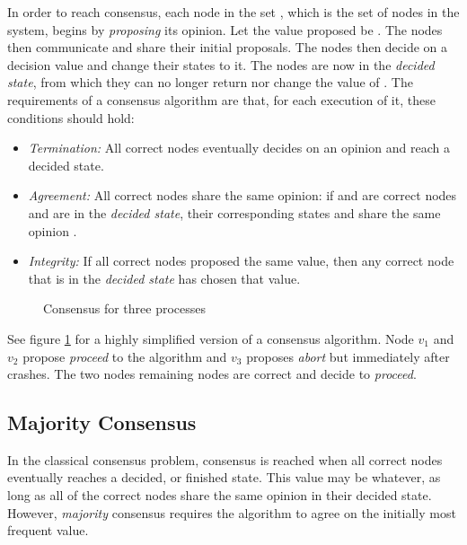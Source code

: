 In order to reach consensus, each node in the set , which is the set of nodes in the system, begins by \emph{proposing} its opinion. Let the value proposed be . The nodes then communicate and share their initial proposals. The nodes then decide on a decision value  and change their states to it. The nodes are now in the \emph{decided state}, from which they can no longer return nor change the value of . The requirements of a consensus algorithm are that, for each execution of it, these conditions should hold:

\begin{itemize}[label={}]
  \item \emph{Termination:} All correct nodes eventually decides on an opinion and reach a decided state.
  \item \emph{Agreement:} All correct nodes share the same opinion: if  and  are correct nodes and are in the \emph{decided state}, their corresponding states  and  share the same opinion .
  \item \emph{Integrity:} If all correct nodes proposed the same value, then any correct node that is in the \emph{decided state} has chosen that value.
\end{itemize}


\begin{figure}[H]
    \centering
    
    \caption{Consensus for three processes}
    \label{fig:ConsensusProblem}
\end{figure}


See figure \ref{fig:ConsensusProblem} for a highly simplified version of a consensus algorithm. Node $v_1$ and $v_2$ propose \emph{proceed} to the algorithm and $v_3$ proposes \emph{abort} but immediately after crashes. The two nodes remaining nodes are correct and decide to \emph{proceed}.

\subsection{Majority Consensus}

In the classical consensus problem, consensus is reached when all correct nodes eventually reaches a decided, or finished state. This value may be whatever, as long as all of the correct nodes share the same opinion in their decided state. However, \emph{majority} consensus requires the algorithm to agree on the initially most frequent value.

